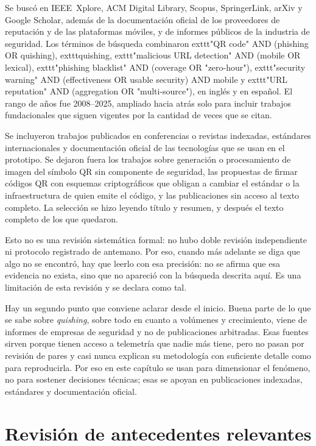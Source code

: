 Se buscó en IEEE~Xplore, ACM Digital Library, Scopus, SpringerLink, arXiv y Google
Scholar, además de la documentación oficial de los proveedores de reputación y de las
plataformas móviles, y de informes públicos de la industria de seguridad. Los términos
de búsqueda combinaron 	exttt{"QR code" AND (phishing OR quishing)},
	exttt{quishing}, 	exttt{"malicious URL detection" AND (mobile OR lexical)},
	exttt{"phishing blacklist" AND (coverage OR "zero-hour")},
	exttt{"security warning" AND (effectiveness OR usable security) AND mobile} y
	exttt{"URL reputation" AND (aggregation OR "multi-source")}, en inglés y en español.
El rango de años fue 2008--2025, ampliado hacia atrás solo para incluir trabajos
fundacionales que siguen vigentes por la cantidad de veces que se citan.

Se incluyeron trabajos publicados en conferencias o revistas indexadas, estándares
internacionales y documentación oficial de las tecnologías que se usan en el
prototipo. Se dejaron fuera los trabajos sobre generación o procesamiento de imagen
del símbolo QR sin componente de seguridad, las propuestas de firmar códigos QR con
esquemas criptográficos que obligan a cambiar el estándar o la infraestructura de
quien emite el código, y las publicaciones sin acceso al texto completo. La selección
se hizo leyendo título y resumen, y después el texto completo de los que quedaron.

Esto no es una revisión sistemática formal: no hubo doble revisión independiente ni
protocolo registrado de antemano. Por eso, cuando más adelante se diga que algo no se
encontró, hay que leerlo con esa precisión: no se afirma que esa evidencia no exista,
sino que no apareció con la búsqueda descrita aquí. Es una limitación de esta revisión
y se declara como tal.

Hay un segundo punto que conviene aclarar desde el inicio. Buena parte de lo que se
sabe sobre \emph{quishing}, sobre todo en cuanto a volúmenes y crecimiento, viene de
informes de empresas de seguridad \cite{verizon2024dbir,insikt2024qrcode,unit42_2023qr}
y no de publicaciones arbitradas. Esas fuentes sirven porque tienen acceso a
telemetría que nadie más tiene, pero no pasan por revisión de pares y casi nunca
explican su metodología con suficiente detalle como para reproducirla. Por eso en este
capítulo se usan para dimensionar el fenómeno, no para sostener decisiones técnicas;
esas se apoyan en publicaciones indexadas, estándares y documentación oficial.

\section{Revisión de antecedentes relevantes}

